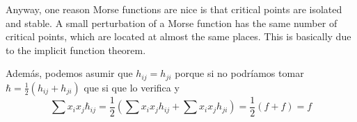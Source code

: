 Anyway, one reason Morse functions are nice is that critical points are isolated and stable. A small perturbation of a Morse function has the same number of critical points, which are located at almost the same places. This is basically due to the implicit function theorem.


 Además, podemos asumir que $h_{ij}=h_{ji}$ porque si no podríamos tomar $\hbar=\frac{1}{2}(h_{ij}+h_{ji})$ que si que lo verifica y
    \begin{equation*}
        \sum x_ix_j\hbar_{ij}=\frac{1}{2}\left(\sum x_ix_jh_{ij}+\sum x_ix_jh_{ji}\right)=\frac{1}{2}(f+f)=f
    \end{equation*}